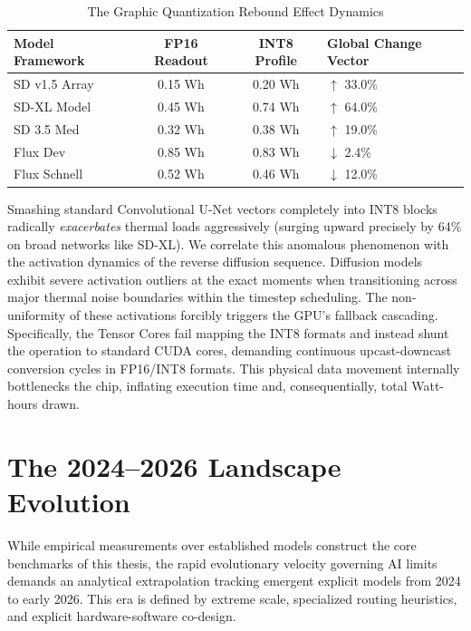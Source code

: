 \documentclass[12pt, a4paper]{report}
\begin{document}
\begin{table}[htbp]
\centering
\caption{The Graphic Quantization Rebound Effect Dynamics}\label{tab:diff_quant_paradox}
\renewcommand{\arraystretch}{1.2}
\begin{tabular}{l c c l}
\toprule
\textbf{Model Framework} & \textbf{FP16 Readout} & \textbf{INT8 Profile} & \textbf{Global Change Vector} \\
\midrule
SD v1.5 Array & 0.15 Wh & 0.20 Wh & {\color{red}$\uparrow$ 33.0\%} \\
SD-XL Model   & 0.45 Wh & 0.74 Wh & {\color{red}$\uparrow$ 64.0\%} \\
SD 3.5 Med    & 0.32 Wh & 0.38 Wh & {\color{red}$\uparrow$ 19.0\%} \\
Flux Dev      & 0.85 Wh & 0.83 Wh & {\color{green}$\downarrow$ 2.4\%} \\
Flux Schnell  & 0.52 Wh & 0.46 Wh & {\color{green}$\downarrow$ 12.0\%} \\
\bottomrule
\end{tabular}
\end{table}

Smashing standard Convolutional U-Net vectors completely into INT8 blocks radically \textit{exacerbates} thermal loads aggressively (surging upward precisely by 64\% on broad networks like SD-XL). We correlate this anomalous phenomenon with the activation dynamics of the reverse diffusion sequence. Diffusion models exhibit severe activation outliers at the exact moments when transitioning across major thermal noise boundaries within the timestep scheduling. The non-uniformity of these activations forcibly triggers the GPU's fallback cascading. Specifically, the Tensor Cores fail mapping the INT8 formats and instead shunt the operation to standard CUDA cores, demanding continuous upcast-downcast conversion cycles in FP16/INT8 formats. This physical data movement internally bottlenecks the chip, inflating execution time and, consequentially, total Watt-hours drawn. 

\chapter{The 2024–2026 Landscape Evolution}
\label{ch:landscape}

While empirical measurements over established models construct the core benchmarks of this thesis, the rapid evolutionary velocity governing AI limits demands an analytical extrapolation tracking emergent explicit models from 2024 to early 2026. This era is defined by extreme scale, specialized routing heuristics, and explicit hardware-software co-design.
\end{document}
